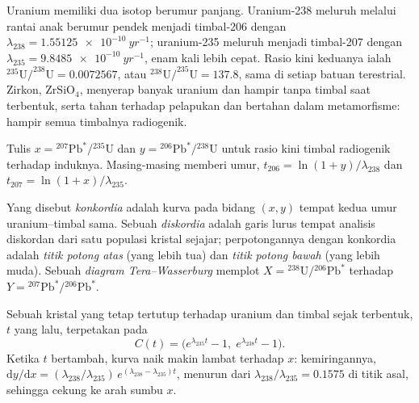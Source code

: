 Uranium memiliki dua isotop berumur panjang. Uranium-238 meluruh melalui rantai
anak berumur pendek menjadi timbal-206 dengan $\lambda_{238} =
\qty{1.55125e-10}{yr^{-1}}$; uranium-235 meluruh menjadi timbal-207 dengan $\lambda_{235}
= \qty{9.8485e-10}{yr^{-1}}$, enam kali lebih cepat. Rasio kini keduanya ialah
$^{235}\mathrm{U}/^{238}\mathrm{U} = 0.0072567$, atau $^{238}\mathrm{U}/^{235}\mathrm{U}
= 137.8$, sama di setiap batuan terestrial. Zirkon, $\mathrm{ZrSiO_4}$, menyerap
banyak uranium dan hampir tanpa timbal saat terbentuk, serta tahan
terhadap pelapukan dan bertahan dalam metamorfisme: hampir semua timbalnya radiogenik.

Tulis $x = {}^{207}\mathrm{Pb}^*/{}^{235}\mathrm{U}$ dan $y =
{}^{206}\mathrm{Pb}^*/{}^{238}\mathrm{U}$ untuk rasio kini timbal radiogenik
terhadap induknya. Masing-masing memberi umur, $t_{206} = \ln(1 + y)/\lambda_{238}$
dan $t_{207} = \ln(1 + x)/\lambda_{235}$.

\begin{definition}
\label{def:b3:advanced-geochronology:concordia}
Yang disebut \emph{konkordia} adalah kurva pada bidang $(x, y)$ tempat
kedua umur uranium--timbal sama. Sebuah \emph{diskordia}
adalah garis lurus tempat analisis diskordan dari satu populasi kristal sejajar;
perpotongannya dengan konkordia adalah
\emph{titik potong atas} (yang lebih tua) dan
\emph{titik potong bawah} (yang lebih muda). Sebuah
\emph{diagram Tera--Wasserburg} memplot
$X = {}^{238}\mathrm{U}/{}^{206}\mathrm{Pb}^*$ terhadap $Y =
{}^{207}\mathrm{Pb}^*/{}^{206}\mathrm{Pb}^*$.
\end{definition}

\begin{theorem}[Konkordia]\label{thm:b3:advanced-geochronology:concordia}
Sebuah kristal yang tetap tertutup terhadap uranium dan timbal sejak terbentuk,
$t$ yang lalu, terpetakan pada
\[
C(t) = \bigl(e^{\lambda_{235}t} - 1,\; e^{\lambda_{238}t} - 1\bigr).
\]
Ketika $t$ bertambah, kurva naik makin lambat terhadap $x$: kemiringannya,
$\mathrm dy/\mathrm dx = (\lambda_{238}/\lambda_{235})\,e^{(\lambda_{238} -
\lambda_{235})t}$, menurun dari $\lambda_{238}/\lambda_{235} = 0.1575$ di
titik asal, sehingga  cekung ke arah sumbu $x$.
\end{theorem}

